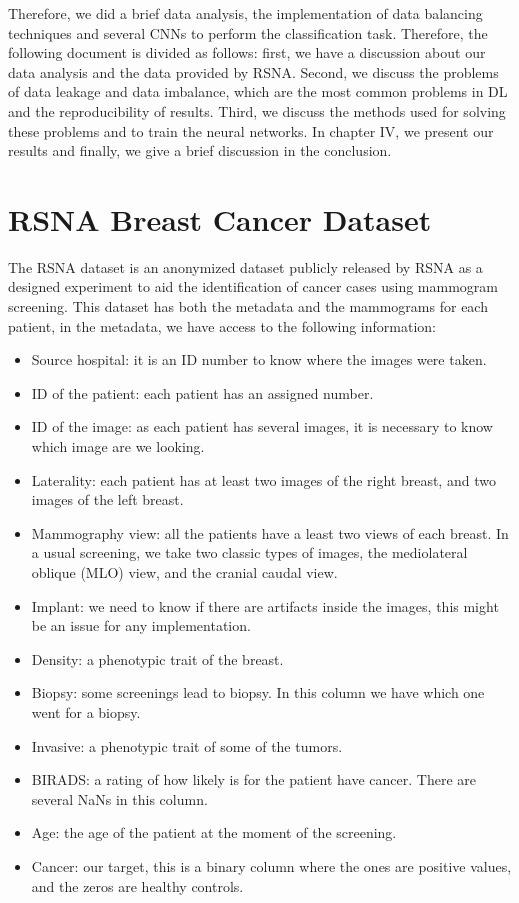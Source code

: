\documentclass[conference]{IEEEtran}
\begin{document}
Therefore, we did a brief data analysis, the implementation of data balancing techniques and several CNNs to perform the classification task. Therefore, the following document is divided as follows: first, we have a discussion about our data analysis and the data provided by RSNA. Second, we discuss the problems of data leakage and data imbalance, which are the most common problems in DL and the reproducibility of results. Third, we discuss the methods used for solving these problems and to train the neural networks. In chapter IV, we present our results and finally, we give a brief discussion in the conclusion. 

\section{RSNA Breast Cancer Dataset}

The RSNA dataset is an anonymized dataset publicly released by RSNA as a designed experiment to aid the identification of cancer cases using mammogram screening. This dataset has both the metadata and the mammograms for each patient, in the metadata, we have access to the following information:

\begin{itemize}
\item Source hospital: it is an ID number to know where the images were taken. 
\item ID of the patient: each patient has an assigned number. 
\item ID of the image: as each patient has several images, it is necessary to know which image are we looking. 
\item Laterality: each patient has at least two images of the right breast, and two images of the left breast. 
\item Mammography view: all the patients have a least two views of each breast. In a usual screening, we take two classic types of images, the mediolateral oblique (MLO) view, and the cranial caudal view. 
\item Implant: we need to know if there are artifacts inside the images, this might be an issue for any implementation.
\item Density: a phenotypic trait of the breast. 
\item Biopsy: some screenings lead to biopsy. In this column we have which one went for a biopsy. 
\item Invasive: a phenotypic trait of some of the tumors. 
\item BIRADS: a rating of how likely is for the patient have cancer. There are several NaNs in this column. 
\item Age: the age of the patient at the moment of the screening. 
\item Cancer: our target, this is a binary column where the ones are positive values, and the zeros are healthy controls.
\end{itemize}
\end{document}
